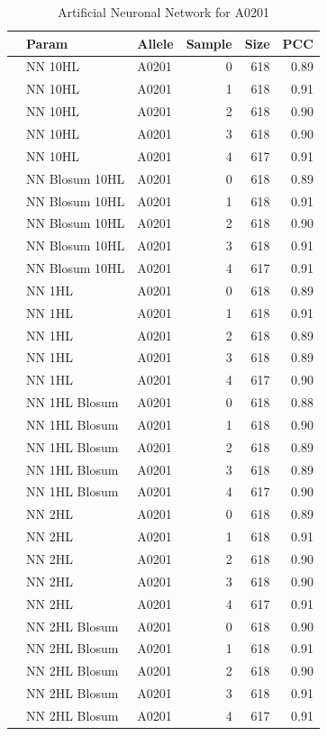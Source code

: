 \begin{table}[ht]
\begin{center}
\begin{tabular}{rllrrr}
  \hline
 & Param & Allele & Sample & Size & PCC \\ 
  \hline
 & NN 10HL & A0201 &   0 & 618 & 0.89 \\ 
   & NN 10HL & A0201 &   1 & 618 & 0.91 \\ 
   & NN 10HL & A0201 &   2 & 618 & 0.90 \\ 
   & NN 10HL & A0201 &   3 & 618 & 0.90 \\ 
   & NN 10HL & A0201 &   4 & 617 & 0.91 \\ 
   \hline
   & NN Blosum 10HL & A0201 &   0 & 618 & 0.89 \\ 
   & NN Blosum 10HL & A0201 &   1 & 618 & 0.91 \\ 
   & NN Blosum 10HL & A0201 &   2 & 618 & 0.90 \\ 
   & NN Blosum 10HL & A0201 &   3 & 618 & 0.91 \\ 
   & NN Blosum 10HL & A0201 &   4 & 617 & 0.91 \\ 
   \hline
   & NN 1HL & A0201 &   0 & 618 & 0.89 \\ 
   & NN 1HL & A0201 &   1 & 618 & 0.91 \\ 
   & NN 1HL & A0201 &   2 & 618 & 0.89 \\ 
   & NN 1HL & A0201 &   3 & 618 & 0.89 \\ 
   & NN 1HL & A0201 &   4 & 617 & 0.90 \\ 
   \hline
   & NN 1HL Blosum & A0201 &   0 & 618 & 0.88 \\ 
   & NN 1HL Blosum & A0201 &   1 & 618 & 0.90 \\ 
   & NN 1HL Blosum & A0201 &   2 & 618 & 0.89 \\ 
   & NN 1HL Blosum & A0201 &   3 & 618 & 0.89 \\ 
   & NN 1HL Blosum & A0201 &   4 & 617 & 0.90 \\ 
   \hline
   & NN 2HL & A0201 &   0 & 618 & 0.89 \\ 
   & NN 2HL & A0201 &   1 & 618 & 0.91 \\ 
   & NN 2HL & A0201 &   2 & 618 & 0.90 \\ 
   & NN 2HL & A0201 &   3 & 618 & 0.90 \\ 
   & NN 2HL & A0201 &   4 & 617 & 0.91 \\ 
   \hline
   & NN 2HL Blosum & A0201 &   0 & 618 & 0.90 \\ 
   & NN 2HL Blosum & A0201 &   1 & 618 & 0.91 \\ 
   & NN 2HL Blosum & A0201 &   2 & 618 & 0.90 \\ 
   & NN 2HL Blosum & A0201 &   3 & 618 & 0.91 \\ 
   & NN 2HL Blosum & A0201 &   4 & 617 & 0.91 \\ 
   \hline
\end{tabular}
\label{tab:nn1}
\caption{Artificial Neuronal Network for A0201}
\end{center}
\end{table}

